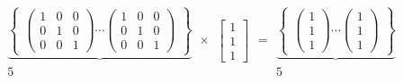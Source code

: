 \begin{footnotesize}
$$
\begin{smallmatrix}  \underbrace{
    \left\{
        \begin{smallmatrix}
            \left(
            \begin{array}{cccc}
             1& 0 &0 \\
             0& 1 &0 \\
             0& 0 &1
            \end{array}
            \right )
            \cdots
            \left(
            \begin{array}{cccc}
                1& 0 &0 \\
                0& 1 &0 \\
                0& 0 &1
            \end{array}
            \right)
        \end{smallmatrix}
        \right\}
     }\\5
\end{smallmatrix}
\times
\begin{smallmatrix}
\left[
    \begin{array}{cccc}
    1\\
    1\\
    1
    \end{array}
\right ]
\end{smallmatrix}
=
\begin{smallmatrix}  \underbrace{
    \left\{
        \begin{smallmatrix}
            \left(
            \begin{array}{cccc}
             1 \\
             1 \\
             1
            \end{array}
            \right)
            \cdots
            \left(
            \begin{array}{cccc}
                1 \\
                1 \\
                1
            \end{array}
            \right)
        \end{smallmatrix}
        \right\}
     }\\5
\end{smallmatrix}
$$
\end{footnotesize}

